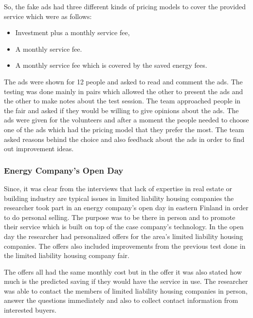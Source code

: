 So, the fake ads had three different kinds of pricing models to cover the provided service which were as follows:
\begin{itemize}
	\setlength{\itemsep}{2pt}
	\item Investment plus a monthly service fee,
	\item A monthly service fee.
	\item A monthly service fee which is covered by the saved energy fees.
\end{itemize}

The ads were shown for 12 people and asked to read and comment the ads. The testing was done mainly in pairs which allowed the other to present the ads and the other to make notes about the test session. The team approached people in the fair and asked if they would be willing to give opinions about the ads. The ads were given for the volunteers and after a moment the people needed to choose one of the ads which had the pricing model that they prefer the most. The team asked reasons behind the choice and also feedback about the ads in order to find out improvement ideas.

\subsubsection*{Energy Company's Open Day}

Since, it was clear from the interviews that lack of expertise in real estate or building industry are typical issues in limited liability housing companies the researcher took part in an energy company's open day in eastern Finland in order to do personal selling. The purpose was to be there in person and to promote their service which is built on top of the case company's technology. In the open day the researcher had personalized offers for the area's limited liability housing companies.  The offers also included improvements from the previous test done in the limited liability housing company fair.

The offers all had the same monthly cost but in the offer it was also stated how much is the predicted saving if they would have the service in use. The researcher was able to contact the members of limited liability housing companies in person, answer the questions immediately and also to collect contact information from interested buyers.

